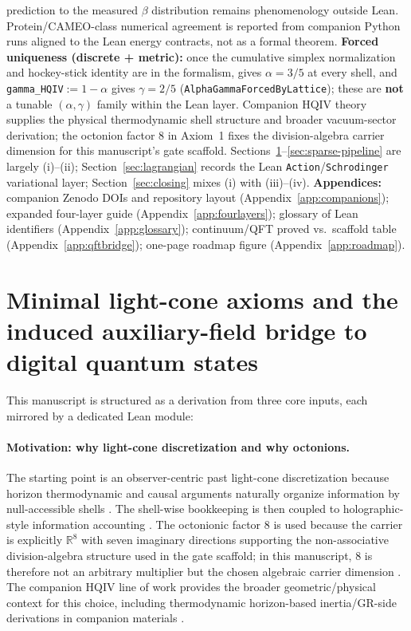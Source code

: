 \documentclass[11pt,a4paper]{article}
\newcommand{\lean}[1]{\path{#1}}
\theoremstyle{remark}
\begin{document}
prediction to the measured $\beta$ distribution remains phenomenology outside Lean. Protein/CAMEO-class numerical agreement is reported from companion Python runs aligned to the Lean energy contracts, not as a formal theorem. \textbf{Forced uniqueness (discrete + metric):} once the cumulative simplex normalization and hockey-stick identity are in the formalism, \lean{latticeAlphaRatio_eq_alpha} gives $\alpha=3/5$ at every shell, and \texttt{gamma\_HQIV}$:=1-\alpha$ gives $\gamma=2/5$ (\texttt{AlphaGammaForcedByLattice}); these are \textbf{not} a tunable $(\alpha,\gamma)$ family within the Lean layer. Companion HQIV theory \cite{ettinger2026hqiv,brodie2026} supplies the physical thermodynamic shell structure and broader vacuum-sector derivation; the octonion factor $8$ in Axiom~1 fixes the division-algebra carrier dimension for this manuscript's gate scaffold. Sections~\ref{sec:axioms}--\ref{sec:sparse-pipeline} are largely (i)--(ii); Section~\ref{sec:lagrangian} records the Lean \texttt{Action}/\texttt{Schrodinger} variational layer; Section~\ref{sec:closing} mixes (i) with (iii)--(iv). \textbf{Appendices:} companion Zenodo DOIs and repository layout (Appendix~\ref{app:companions}); expanded four-layer guide (Appendix~\ref{app:fourlayers}); glossary of Lean identifiers (Appendix~\ref{app:glossary}); continuum/QFT proved vs.\ scaffold table (Appendix~\ref{app:qftbridge}); one-page roadmap figure (Appendix~\ref{app:roadmap}).

\section{Minimal light-cone axioms and the induced auxiliary-field bridge to digital quantum states}
\label{sec:axioms}

This manuscript is structured as a derivation from three core inputs, each mirrored by a dedicated Lean module:

\paragraph{Motivation: why light-cone discretization and why octonions.}
The starting point is an observer-centric past light-cone discretization because horizon thermodynamic and causal arguments naturally organize information by null-accessible shells \cite{jacobson1995,bombelli1987}. The shell-wise bookkeeping is then coupled to holographic-style information accounting \cite{susskind1994,bousso2002}. The octonionic factor $8$ is used because the carrier is explicitly $\mathbb{R}^8$ with seven imaginary directions supporting the non-associative division-algebra structure used in the gate scaffold; in this manuscript, $8$ is therefore not an arbitrary multiplier but the chosen algebraic carrier dimension \cite{baez2002octonions,freedman2019}. The companion HQIV line of work provides the broader geometric/physical context for this choice, including thermodynamic horizon-based inertia/GR-side derivations in companion materials \cite{ettinger2026hqiv,brodie2026}.
\end{document}
